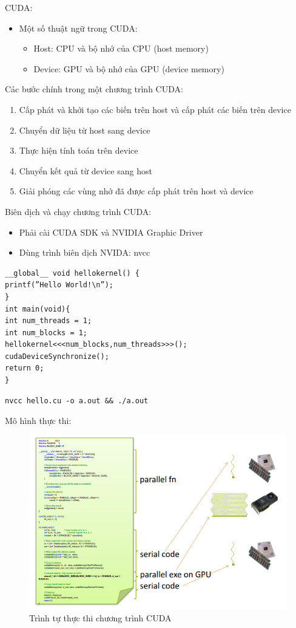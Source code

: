 \documentclass[14pt, a4paper]{article}
\numberwithin{equation}{section}
\numberwithin{figure}{section}
\numberwithin{dl}{section}
\numberwithin{md}{section}
\numberwithin{bd}{section}
\numberwithin{dn}{section}
\numberwithin{hq}{section}
\begin{document}
CUDA:

\begin{itemize}
    \item Một số thuật ngữ trong CUDA:
    \begin{itemize}
        \item Host: CPU và bộ nhớ của CPU (host memory)
        \item Device: GPU và bộ nhớ của GPU (device memory)
    \end{itemize}
\end{itemize}

Các bước chính trong một chương trình CUDA:

\begin{enumerate}
    \item Cấp phát và khởi tạo các biến trên host và cấp phát các biến trên device
    \item Chuyển dữ liệu từ host sang device
    \item Thực hiện tính toán trên device
    \item Chuyển kết quả từ device sang host
    \item Giải phóng các vùng nhớ đã được cấp phát trên host và device
\end{enumerate}

Biên dịch và chạy chương trình CUDA:

\begin{itemize}
    \item Phải cài CUDA SDK và NVIDIA Graphic Driver
    \item Dùng trình biên dịch NVIDA: nvcc
\end{itemize}
\begin{verbatim}
__global__ void hellokernel() {
printf(”Hello World!\n”);
}
int main(void){
int num_threads = 1;
int num_blocks = 1;
hellokernel<<<num_blocks,num_threads>>>();
cudaDeviceSynchronize();
return 0;
}
\end{verbatim}
\begin{verbatim}
nvcc hello.cu -o a.out && ./a.out
\end{verbatim}

Mô hình thực thi:

\begin{figure}[H]
    \centering
    \includegraphics[width=0.8\linewidth]{figures/CUDA/Execution_Model.png}
    \caption{Trình tự thực thi chương trình CUDA}
\end{figure}
\end{document}

